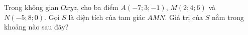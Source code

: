 \begin{ex}
Trong không gian $Oxyz$, cho ba điểm $A(-7;3;-1)$, $M(2;4;6)$ và $N(-5;8;0)$. Gọi $S$ là diện tích của tam giác $AMN$. Giá trị của $S$ nằm trong khoảng nào sau đây?
\end{ex}
